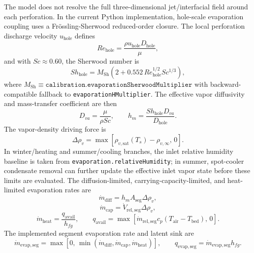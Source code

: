 \documentclass[11pt]{article}
\begin{document}
The model does not resolve the full three-dimensional jet/interfacial field around each perforation. In the current Python implementation, hole-scale evaporation coupling uses a Fr\"ossling-Sherwood reduced-order closure. The local perforation discharge velocity \(u_{\mathrm{hole}}\) defines
\begin{equation}
\label{eq:re_hole_evap}
Re_{\mathrm{hole}}=\frac{\rho u_{\mathrm{hole}}D_{\mathrm{hole}}}{\mu},
\end{equation}
and with \(Sc\approx 0.60\), the Sherwood number is
\begin{equation}
\label{eq:froessling_sherwood}
Sh_{\mathrm{hole}}=M_{\mathrm{Sh}}\left(2+0.552\,Re_{\mathrm{hole}}^{1/2}Sc^{1/3}\right),
\end{equation}
where \(M_{\mathrm{Sh}}\equiv\texttt{calibration.evaporationSherwoodMultiplier}\) with backward-compatible fallback to \texttt{evaporationHMultiplier}. The effective vapor diffusivity and mass-transfer coefficient are then
\begin{equation}
\label{eq:evap_diffusivity}
D_{va}=\frac{\mu}{\rho Sc},
\qquad
h_m=\frac{Sh_{\mathrm{hole}}D_{va}}{D_{\mathrm{hole}}}.
\end{equation}
The vapor-density driving force is
\begin{equation}
\label{eq:vapor_density_drive}
\Delta\rho_v=\max\!\left[\rho_{v,\mathrm{sat}}(T_s)-\rho_{v,\infty},\,0\right].
\end{equation}
In winter/heating and summer/cooling branches, the inlet relative humidity baseline is taken from \texttt{evaporation.relativeHumidity}; in summer, spot-cooler condensate removal can further update the effective inlet vapor state before these limits are evaluated.
The diffusion-limited, carrying-capacity-limited, and heat-limited evaporation rates are
\begin{equation}
\label{eq:evap_diff}
\dot m_{\mathrm{diff}}=h_mA_{\mathrm{seg}}\Delta\rho_v,
\end{equation}
\begin{equation}
\label{eq:evap_capacity}
\dot m_{\mathrm{cap}}=\dot V_{\mathrm{rel,seg}}\Delta\rho_v,
\end{equation}
\begin{equation}
\label{eq:evap_heat}
\dot m_{\mathrm{heat}}=\frac{q_{\mathrm{avail}}}{h_{fg}},
\qquad
q_{\mathrm{avail}}=\max\!\left[\dot m_{\mathrm{rel,seg}}c_p(T_{\mathrm{air}}-T_{\mathrm{bed}}),\,0\right].
\end{equation}
The implemented segment evaporation rate and latent sink are
\begin{equation}
\label{eq:evap_selected}
\dot m_{\mathrm{evap,seg}}=
\max\!\left[
0,\,
\min\!\left(\dot m_{\mathrm{diff}},\dot m_{\mathrm{cap}},\dot m_{\mathrm{heat}}\right)
\right],
\qquad
q_{\mathrm{evap,seg}}=\dot m_{\mathrm{evap,seg}}h_{fg}.
\end{equation}
\end{document}
